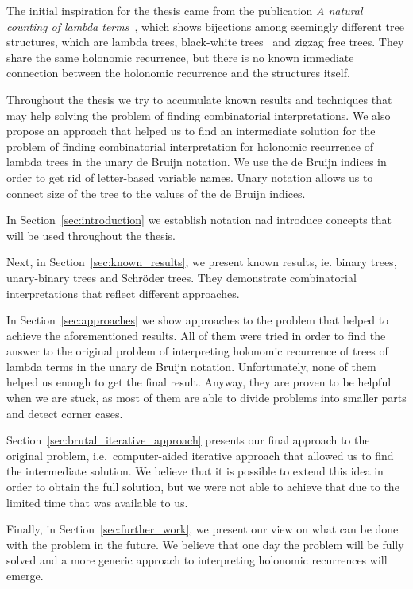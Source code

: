\documentclass[final]{article}
\theoremstyle{definition}
\theoremstyle{remark}
\begin{document}
The initial inspiration for the thesis came from the publication \textit{A natural counting of lambda terms}~\cite{inspiration}, which shows bijections among seemingly different tree structures, which are lambda trees, black-white trees~\cite{blackwhite} and zigzag free trees. They share the same holonomic recurrence, but there is no known immediate connection between the holonomic recurrence and the structures itself.

Throughout the thesis we try to accumulate known results and techniques that may help solving the problem of finding combinatorial interpretations. We also propose an approach that helped us to find an intermediate solution for the problem of finding combinatorial interpretation for holonomic recurrence of lambda trees in the unary de Bruijn notation. We use the de Bruijn indices in order to get rid of letter-based variable names. Unary notation allows us to connect size of the tree to the values of the de Bruijn indices.

In Section~\ref{sec:introduction} we establish notation nad introduce concepts that will be used throughout the thesis.

Next, in Section~\ref{sec:known_results}, we present known results, ie. binary trees, unary-binary trees and Schröder trees. They demonstrate combinatorial interpretations that reflect different approaches.

In Section~\ref{sec:approaches} we show approaches to the problem that helped to achieve the aforementioned results. All of them were tried in order to find the answer to the original problem of interpreting holonomic recurrence of trees of lambda terms in the unary de Bruijn notation. Unfortunately, none of them helped us enough to get the final result. Anyway, they are proven to be helpful when we are stuck, as most of them are able to divide problems into smaller parts and detect corner cases.

Section~\ref{sec:brutal_iterative_approach} presents our final approach to the original problem, i.e.\ computer-aided iterative approach that allowed us to find the intermediate solution. We believe that it is possible to extend this idea in order to obtain the full solution, but we were not able to achieve that due to the limited time that was available to us.

Finally, in Section~\ref{sec:further_work}, we present our view on what can be done with the problem in the future. We believe that one day the problem will be fully solved and a more generic approach to interpreting holonomic recurrences will emerge.
\end{document}
